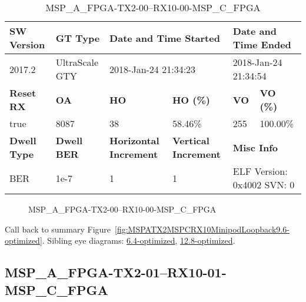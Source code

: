 \begin{table}[h]
\centering
\caption{MSP\_A\_FPGA-TX2-00--RX10-00-MSP\_C\_FPGA}
\label{tab:MSPAFPGATX200RX1000MSPCFPGA9.6-optimized}
\begin{tabular}{@{}|l|l|l|l|l|l|@{}}
\toprule
\textbf{SW Version}                & \textbf{GT Type}   & \multicolumn{2}{l|}{\textbf{Date and Time Started}}            & \multicolumn{2}{l|}{\textbf{Date and Time Ended}}        \\ \midrule
2017.2                       & UltraScale GTY          & \multicolumn{2}{l|}{2018-Jan-24 21:34:23}                   & \multicolumn{2}{l|}{2018-Jan-24 21:34:54}               \\ \midrule
\textbf{Reset RX}                  & \textbf{OA} & \textbf{HO}   & \textbf{HO (\%)} & \textbf{VO} & \textbf{VO (\%)} \\ \midrule
true & 8087        & 38          & 58.46\%        & 255        & 100.00\%       \\ \midrule
\textbf{Dwell Type}                & \textbf{Dwell BER} & \textbf{Horizontal Increment} & \textbf{Vertical Increment}    & \multicolumn{2}{l|}{\textbf{Misc Info}}                  \\ \midrule
BER                            & 1e-7        & 1        & 1           & \multicolumn{2}{l|}{ELF Version: 0x4002 SVN: 0}                         \\ \bottomrule
\end{tabular}
\end{table}

\begin{figure}[h]
\caption{MSP\_A\_FPGA-TX2-00--RX10-00-MSP\_C\_FPGA} \label{fig:MSPAFPGATX200RX1000MSPCFPGA9.6-optimized}
\end{figure}

Call back to summary Figure~\ref{fig:MSPATX2MSPCRX10MinipodLoopback9.6-optimized}.
Sibling eye diagrams: \hyperref[sec:MSPAFPGATX200RX1000MSPCFPGA6.4-optimized]{6.4-optimized}, \hyperref[sec:MSPAFPGATX200RX1000MSPCFPGA12.8-optimized]{12.8-optimized}.

\clearpage
\newpage


\subsection{MSP\_A\_FPGA-TX2-01--RX10-01-MSP\_C\_FPGA}\label{sec:MSPAFPGATX201RX1001MSPCFPGA9.6-optimized}

